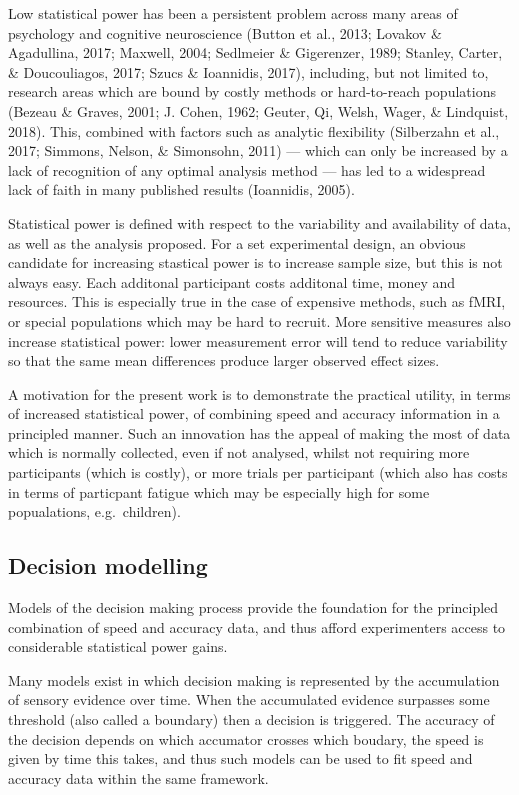 \documentclass[floatsintext,doc]{apa6}
\theoremstyle{definition}
\theoremstyle{definition}
\theoremstyle{definition}
\theoremstyle{remark}
\begin{document}
Low statistical power has been a persistent problem across many areas of
psychology and cognitive neuroscience (Button et al., 2013; Lovakov \&
Agadullina, 2017; Maxwell, 2004; Sedlmeier \& Gigerenzer, 1989; Stanley,
Carter, \& Doucouliagos, 2017; Szucs \& Ioannidis, 2017), including, but
not limited to, research areas which are bound by costly methods or
hard-to-reach populations (Bezeau \& Graves, 2001; J. Cohen, 1962;
Geuter, Qi, Welsh, Wager, \& Lindquist, 2018). This, combined with
factors such as analytic flexibility (Silberzahn et al., 2017; Simmons,
Nelson, \& Simonsohn, 2011) --- which can only be increased by a lack of
recognition of any optimal analysis method --- has led to a widespread
lack of faith in many published results (Ioannidis, 2005).

Statistical power is defined with respect to the variability and
availability of data, as well as the analysis proposed. For a set
experimental design, an obvious candidate for increasing stastical power
is to increase sample size, but this is not always easy. Each additonal
participant costs additonal time, money and resources. This is
especially true in the case of expensive methods, such as fMRI, or
special populations which may be hard to recruit. More sensitive
measures also increase statistical power: lower measurement error will
tend to reduce variability so that the same mean differences produce
larger observed effect sizes.

A motivation for the present work is to demonstrate the practical
utility, in terms of increased statistical power, of combining speed and
accuracy information in a principled manner. Such an innovation has the
appeal of making the most of data which is normally collected, even if
not analysed, whilst not requiring more participants (which is costly),
or more trials per participant (which also has costs in terms of
particpant fatigue which may be especially high for some popualations,
e.g.~children).

\subsection{Decision modelling}\label{decision-modelling}

Models of the decision making process provide the foundation for the
principled combination of speed and accuracy data, and thus afford
experimenters access to considerable statistical power gains.

Many models exist in which decision making is represented by the
accumulation of sensory evidence over time. When the accumulated
evidence surpasses some threshold (also called a boundary) then a
decision is triggered. The accuracy of the decision depends on which
accumator crosses which boudary, the speed is given by time this takes,
and thus such models can be used to fit speed and accuracy data within
the same framework.
\end{document}

